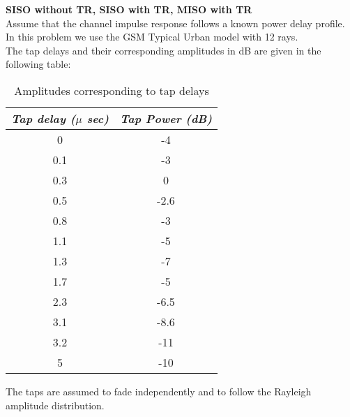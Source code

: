\textbf{SISO without TR, SISO with TR, MISO with TR}\\

Assume that the channel impulse response follows a known power delay profile. In this problem we use the GSM Typical Urban model with 12 rays.\\ The tap delays and their corresponding amplitudes in dB are given in the following table: 
\begin{table}[ht]
\centering
\begin{tabular}{c|c}
{\em Tap delay ($\mu$ sec)\/} & {\em Tap Power (dB)\/}  \\
\hline 0 & -4  \\
0.1 & -3 \\
0.3 & 0 \\
0.5 & -2.6\\
0.8 & -3\\
1.1 & -5\\
1.3 & -7\\
1.7 & -5\\
2.3 & -6.5\\
3.1 & -8.6\\
3.2 & -11\\
5 & -10
\end{tabular}\label{Test}
\caption{Amplitudes corresponding to tap delays}
\label{tab:1_intro}
\end{table} 

The taps are assumed to fade independently and to follow the Rayleigh amplitude distribution. 